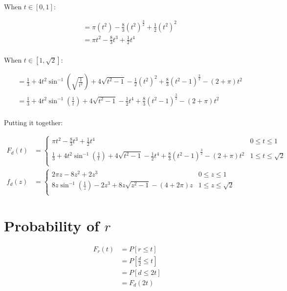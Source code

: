 \documentclass{article}
\begin{document}
When $t \in [0, 1]$:

\begin{align*}
&= \pi (t^2) - \frac{8}{3} (t^2)^{\frac{3}{2}} + \frac{1}{2}(t^2)^2 \\
&= \pi t^2 - \frac{8}{3} t^3+ \frac{1}{2}t^4 \\
\end{align*}

When $t \in [1, \sqrt{2}]$:

\begin{align*}
&= \frac{1}{3} + 4t^2 \sin^{-1} \left( \sqrt{\frac{1}{t^2}} \right) + 4\sqrt{t^2-1} - \frac{1}{2} (t^2)^2 + \frac{8}{3}(t^2 - 1)^\frac{3}{2} - (2 + \pi) t^2 \\
&= \frac{1}{3} + 4t^2 \sin^{-1} \left( \frac{1}{t} \right) + 4\sqrt{t^2-1} - \frac{1}{2} t^4 + \frac{8}{3}(t^2 - 1)^\frac{3}{2} - (2 + \pi) t^2 \\
\end{align*}

Putting it together:

\begin{align*}
F_d(t) &=
\begin{cases}
    \pi t^2 - \frac{8}{3} t^3 + \frac{1}{2}t^4
        & 0 \leq t \leq 1 \\
    \frac{1}{3} + 4t^2 \sin^{-1} \left( \frac{1}{t} \right) + 4\sqrt{t^2-1} - \frac{1}{2} t^4 + \frac{8}{3}(t^2 - 1)^\frac{3}{2} - (2 + \pi) t^2
        & 1 \leq t \leq \sqrt{2} \\
\end{cases}
\\
f_d(z) &=
\begin{cases}
    2\pi z - 8z^2 + 2z^3
        & 0 \leq z \leq 1 \\
    8z \sin^{-1} \left( \frac{1}{z} \right) - 2z^3 + 8z\sqrt{z^2 - 1} - (4 + 2\pi) z
        & 1 \leq z \leq \sqrt{2} \\
\end{cases}
\end{align*}

\section{Probability of $r$}

\begin{align*}
F_r(t)
&= P[r \leq t] \\
&= P \left[ \frac{d}{2} \leq t \right] \\
&= P[d \leq 2t] \\
&= F_d(2t) \\
\end{align*}
\end{document}
